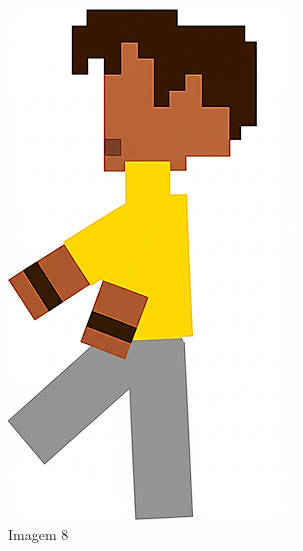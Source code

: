 \begin{figure}[htbp]
\begin{subfigure}{0.23\linewidth}
        \includegraphics[width=1\linewidth]{figs/geminiPro/chat10/tela1_res2_8.PNG}
        \caption{\small Imagem 8}
        \label{fig:geminiProSheet5_2h}
    \end{subfigure}
    \begin{subfigure}{0.23\linewidth}

\end{subfigure}
\end{figure}
